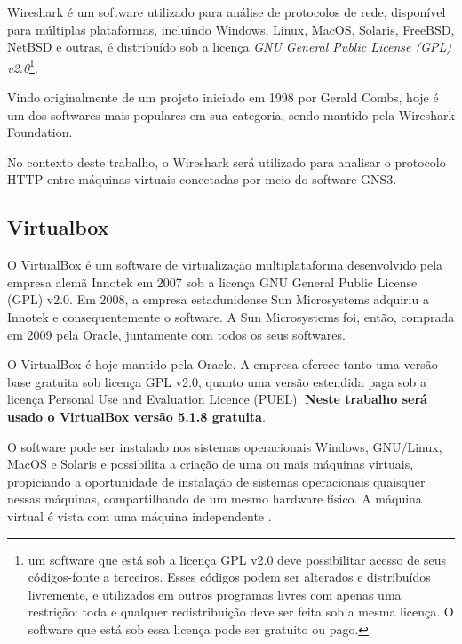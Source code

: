 Wireshark é um software utilizado para análise de protocolos de rede, disponível para múltiplas plataformas, incluindo Windows, Linux, MacOS, Solaris, FreeBSD, NetBSD e outras, é distribuído sob a licença \textit{GNU General Public License (GPL) v2.0}\footnote{um software que está sob a licença GPL v2.0 deve possibilitar acesso de seus códigos-fonte a terceiros. Esses códigos podem ser alterados e distribuídos livremente, e utilizados em outros programas livres com apenas uma restrição: toda e qualquer redistribuição deve ser feita sob a mesma licença. O software que está sob essa licença pode ser gratuito ou pago.}.

Vindo originalmente de um projeto iniciado em 1998 por Gerald Combs, hoje é um dos softwares mais populares em sua categoria, sendo mantido pela Wireshark Foundation.

No contexto deste trabalho, o Wireshark será utilizado para analisar o protocolo HTTP entre máquinas virtuais conectadas por meio do software GNS3.

\subsection{Virtualbox}

O VirtualBox é um software de virtualização multiplataforma desenvolvido pela empresa alemã Innotek em 2007 sob a licença GNU General Public License (GPL) v2.0. Em 2008, a empresa estadunidense Sun Microsystems adquiriu a Innotek e consequentemente o software. A Sun Microsystems foi, então, comprada em 2009 pela Oracle, juntamente com todos os seus softwares. 	

O VirtualBox é hoje mantido pela Oracle. A empresa oferece tanto uma versão base gratuita sob licença GPL v2.0, quanto uma versão estendida paga sob a licença Personal Use and Evaluation Licence (PUEL). \textbf{Neste trabalho será usado o VirtualBox versão 5.1.8 gratuita}.

O software pode ser instalado nos sistemas operacionais Windows, GNU/Linux, MacOS e Solaris e possibilita a criação de uma ou mais máquinas virtuais, propiciando a oportunidade de instalação de sistemas operacionais quaisquer nessas máquinas, compartilhando de um mesmo hardware físico. A máquina virtual é vista com uma máquina independente \cite{VirtualBox}.





